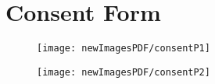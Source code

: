 \section{Consent Form}
 
\begin{figure}[b]
	\begin{center}
		\texttt{[image: newImagesPDF/consentP1]}
	\end{center}
\end{figure}

\begin{figure}[b]
	\begin{center}
		\texttt{[image: newImagesPDF/consentP2]}
	\end{center}
\end{figure}